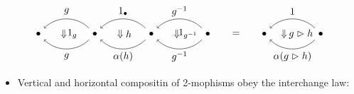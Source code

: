 \documentclass[12pt,aspectratio=53,mathserif]{beamer}
\begin{document}
       \begin{frame} 
        \item {}
        $$\begin{tikzpicture}
           \node[black](a)at(0, 0){$\bullet $};
           \node[black](b)at(2, 0){$\bullet $};
           \node[black](c)at(4, 0){$\bullet $};
           \node[black](d)at(6, 0){$\bullet $};
           \node[black](e)at(1, 0.8){$g$};
           \node[black](f)at(1, -0.8){$g$};
           \node[black](g)at(3, 0.8){$1_\bullet$};
           \node[black](h)at(3, -0.8){$\alpha(h)$};
           \node[black](i)at(5, 0.8){$g^{-1}$};
           \node[black](j)at(5, -0.8){$g^{-1}$};
           \draw[<-](a)to [bend left=45](b);
           \draw[<-](a)to [bend right=45](b);
           \draw[<-](b)to [bend left=45](c);
           \draw[<-](b)to [bend right=45](c);
           \draw[<-](c)to [bend left=45](d);
           \draw[<-](c)to [bend right=45](d);
           \node[black]at(1. 2, 0. 0){$1_g$};
           \node[black]at(0. 9, 0. 0){$\Downarrow $};
           \node[black]at(3. 2, 0. 0){$h$};
           \node[black]at(2. 9, 0. 0){$\Downarrow $};
           \node[black]at(5. 3, 0. 0){$1_{g^{-1}}$};
           \node[black]at(4. 9, 0. 0){$\Downarrow $};
           \node[black](k)at(7, 0){$=$};
           \node[black](m)at(8, 0){$\bullet $};
           \node[black](n)at(10, 0){$\bullet $};
           \draw[<-](m)to [bend right=45](n);
           \draw[<-](m)to [bend left=45](n);
           \node[black](e)at(9, 0.8){$1$};
           \node[black](f)at(9, -0.8){$\alpha (g\vartriangleright h)$};
           \node[black]at(9.3, 0. 0){$ g\vartriangleright h $};
           \node[black]at(8.7, 0. 0){$\Downarrow $};
           
           
       \end{tikzpicture}$$
       
        \end{frame}
       
       \begin{frame}
           \begin{itemize}
               \item Vertical and horizontal compositin of 2-mophisms obey the interchange law:
           \end{itemize}
           \end{frame}
   
\end{document}
